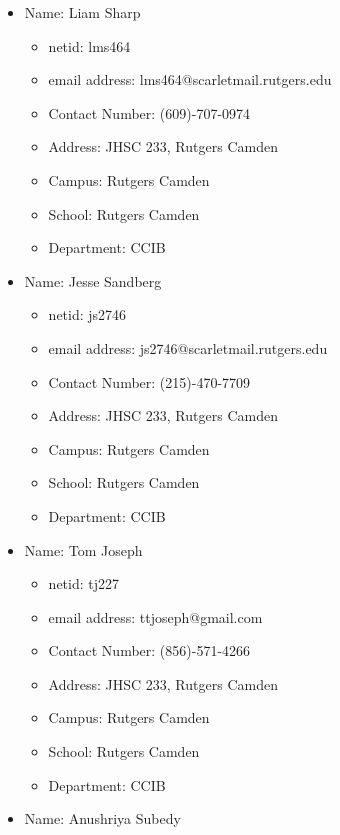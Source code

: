 \documentclass[oneside]{report}
\begin{document}
        \begin{itemize}
        		\item Name: Liam Sharp
                \begin{itemize}       
			\item netid: lms464
                    	\item email address: lms464@scarletmail.rutgers.edu
                    	\item Contact Number: (609)-707-0974
                    	\item Address: JHSC 233, Rutgers Camden
                    	\item Campus: Rutgers Camden
                    	\item School: Rutgers Camden
                    	\item Department: CCIB
		\end{itemize}
		\item Name: Jesse Sandberg
	        \begin{itemize}
			\item netid: js2746
                    	\item email address: js2746@scarletmail.rutgers.edu
                    	\item Contact Number: (215)-470-7709
                    	\item Address: JHSC 233, Rutgers Camden
                    	\item Campus: Rutgers Camden
                    	\item School: Rutgers Camden
                    	\item Department: CCIB
	    \end{itemize}
	    \item Name: Tom Joseph
	    \begin{itemize}
	    		\item netid: tj227
                    	\item email address: ttjoseph@gmail.com
                    	\item Contact Number: (856)-571-4266
                    	\item Address: JHSC 233, Rutgers Camden
                    	\item Campus: Rutgers Camden
                    	\item School: Rutgers Camden
                    	\item Department: CCIB
	    \end{itemize}
	    \item Name: Anushriya Subedy

\end{itemize}
\end{document}
